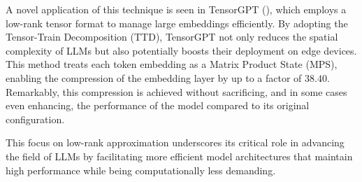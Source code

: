         A novel application of this technique is seen in TensorGPT (\cite{xu2023tensorgpt}), which employs a low-rank tensor format to manage large embeddings efficiently. By adopting the Tensor-Train Decomposition (TTD), TensorGPT not only reduces the spatial complexity of LLMs but also potentially boosts their deployment on edge devices. This method treats each token embedding as a Matrix Product State (MPS), enabling the compression of the embedding layer by up to a factor of \(38.40\). Remarkably, this compression is achieved without sacrificing, and in some cases even enhancing, the performance of the model compared to its original configuration.
        
        This focus on low-rank approximation underscores its critical role in advancing the field of LLMs by facilitating more efficient model architectures that maintain high performance while being computationally less demanding.



